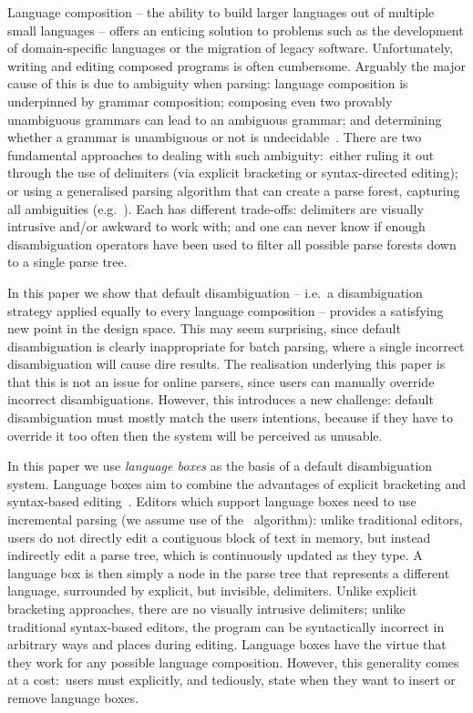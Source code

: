 \documentclass[sigplan,screen]{acmart}
\begin{document}
Language composition -- the ability to build larger languages out of multiple
small languages -- offers an enticing solution to problems such as the
development of domain-specific languages or the migration of legacy software.
Unfortunately, writing and editing composed programs is often cumbersome.
Arguably the major cause of this is due to ambiguity when parsing: language composition is underpinned by grammar
composition; composing even two provably unambiguous grammars can lead to an
ambiguous grammar; and determining whether a grammar is unambiguous or not is
undecidable~\cite{cantor62ambiguity}. There are two fundamental approaches
to dealing with such ambiguity:~either ruling it out through the use of
delimiters (via explicit bracketing or syntax-directed
editing); or using a generalised parsing algorithm that can create a parse
forest, capturing all ambiguities
(e.g.~\cite{visser97scannerless}). Each has different trade-offs: delimiters
are visually intrusive and/or awkward to work with; and one can never know if
enough disambiguation operators have been used to filter all possible parse
forests down to a single parse tree.

In this paper we show that default disambiguation -- i.e.~a disambiguation
strategy applied equally to every language composition -- provides a satisfying new
point in the design space. This may seem surprising,
since default disambiguation is clearly inappropriate for batch
parsing, where a single incorrect disambiguation will cause dire results.
The realisation underlying this paper is that this is not an issue for online parsers,
since users can manually override incorrect disambiguations. However, this
introduces a new challenge: default disambiguation must mostly match the users
intentions, because if they have to override it too often then the system will
be perceived as unusable.

In this paper we use \emph{language boxes} as the basis of a default
disambiguation system. Language boxes aim to
combine the advantages of explicit bracketing and syntax-based
editing~\cite{diekmann14eco}. Editors
which support language boxes need to use incremental parsing
(we assume use of the~\citet{wagner98practicalalgorithms} algorithm):
unlike traditional editors, users do not directly edit
a contiguous block of text in memory, but instead
indirectly edit a parse tree, which is continuously updated as they type.
A language box is then simply a node in the parse
tree that represents a different language, surrounded by
explicit, but invisible, delimiters. Unlike explicit bracketing approaches,
there are no visually intrusive delimiters; unlike traditional
syntax-based editors, the program can be syntactically incorrect in arbitrary
ways and places during editing. Language boxes have the virtue that they work for any possible
language composition. However, this generality comes at a cost:~users
must explicitly, and tediously, state when they want
to insert or remove language boxes.
\end{document}
